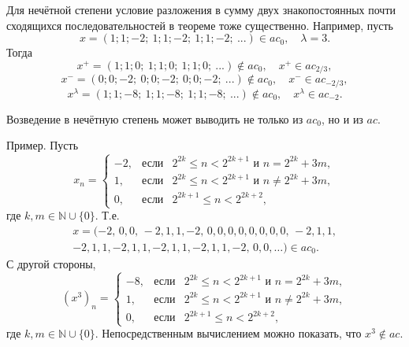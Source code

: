 \documentclass[14pt, a4paper]{extbook}
\begin{document}
		Для нечётной степени условие разложения в сумму двух знакопостоянных
		почти сходящихся последовательностей в теореме тоже существенно.
		Например, пусть
		\begin{equation*}
			x = (1;1;-2;\ 1;1;-2;\ 1;1;-2;\ ...) \in ac_0
			,
			\quad
			\lambda = 3
			.
		\end{equation*}
		Тогда
		\begin{equation*}
			x^+ = (1;1;0;\ 1;1;0;\ 1;1;0;\ ...) \notin ac_0, \quad x^+ \in ac_{2/3}
			,
		\end{equation*}
		\begin{equation*}
			x^- = (0;0;-2;\ 0;0;-2;\ 0;0;-2;\ ...) \notin ac_0, \quad x^- \in ac_{-2/3}
			,
		\end{equation*}
		\begin{equation*}
			x^\lambda = (1;1;-8;\ 1;1;-8;\ 1;1;-8;\ ...) \notin ac_0, \quad x^\lambda \in ac_{-2}
			.
		\end{equation*}



Возведение в нечётную степень может выводить не только из $ac_0$,
но и из $ac$.

Пример.
	Пусть
    $$
        x_n = \left\{
        \begin{array}{ccl}
        	-2, & \text{если} & 2^{2k} \leqslant n < 2^{2k + 1} \text{ и } n = 2^{2k} + 3m,\\%
        	1, & \text{если} & 2^{2k} \leqslant n < 2^{2k + 1} \text{ и } n \neq 2^{2k} + 3m,\\%
        	0, & \text{если} & 2^{2k + 1} \leqslant n < 2^{2k + 2},
        \end{array}
        \right.
    $$
    где $k,m \in \mathbb N \cup \{0\}$. Т.е.
    \begin{multline*}
        x = (-2, \, 0, 0, \, -2, 1, 1, -2, \, 0, 0, 0, 0, 0, 0, 0, 0, \, -2, 1, 1, \\ -2, 1, 1, -2, 1, 1,
        -2, 1, 1, -2, 1, 1, -2,
        \, 0, 0, \ldots) \in ac_0.
    \end{multline*}
	С другой стороны,
    $$
        (x^3)_n = \left\{
        \begin{array}{ccl}
        	-8, & \text{если} & 2^{2k} \leqslant n < 2^{2k + 1} \text{ и } n = 2^{2k} + 3m, \\%
        	1, & \text{если} & 2^{2k} \leqslant n < 2^{2k + 1} \text{ и } n \neq 2^{2k} + 3m, \\%
        	0, & \text{если} & 2^{2k + 1} \leqslant n < 2^{2k + 2},
        \end{array}
        \right.
    $$
    где $k,m \in \mathbb N \cup \{0\}$.
   	Непосредственным вычислением можно показать, что $x^3 \notin ac$.
\end{document}
